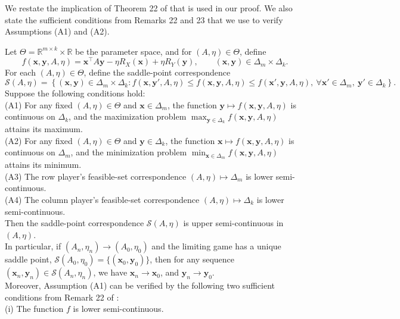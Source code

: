 \documentclass[12pt]{article}
\begin{document}
We restate the implication of Theorem 22 of \citet{feinberg2022continuity} that is used in our proof. 
We also state the sufficient conditions from Remarks 22 and 23 that we use to verify Assumptions (A1) and (A2).
\begin{lemma}
\label{lem:adapted-continuity-equilibria}
Let \(\Theta=\mathbb R^{m\times k}\times \mathbb R\) be the parameter space, and for 
\((A,\eta)\in\Theta\), define
\[
f(\bm x,\bm y,A,\eta)
=
\bm x^\top A\bm y-\eta R_X(\bm x)+\eta R_Y(\bm y),
\qquad
(\bm x,\bm y)\in \Delta_m\times \Delta_k .
\]
For each \((A,\eta)\in\Theta\), define the saddle-point correspondence
\[
\mathcal S(A,\eta)
=
\left\{
(\bm x,\bm y)\in\Delta_m\times\Delta_k:
f(\bm x,\bm y',A,\eta)
\le
f(\bm x,\bm y,A,\eta)
\le
f(\bm x',\bm y,A,\eta),
\ \forall \bm x'\in\Delta_m,\ \bm y'\in\Delta_k
\right\}.
\]
Suppose the following conditions hold: \\
(A1) For any fixed \((A,\eta)\in\Theta\) and \(\bm x\in\Delta_m\), the function $\bm y\mapsto f(\bm x,\bm y,A,\eta)$ is continuous on \(\Delta_k\), and the maximization problem $\max_{\bm y\in\Delta_k} f(\bm x,\bm y,A,\eta)$ attains its maximum. \\
(A2) For any fixed \((A,\eta)\in\Theta\) and \(\bm y\in\Delta_k\), the function $\bm x\mapsto f(\bm x,\bm y,A,\eta)$ is continuous on \(\Delta_m\), and the minimization problem $\min_{\bm x\in\Delta_m} f(\bm x,\bm y,A,\eta)$ attains its minimum. \\
(A3) The row player's feasible-set correspondence $(A,\eta)\mapsto \Delta_m$ is lower semi-continuous. \\
(A4) The column player's feasible-set correspondence $(A,\eta)\mapsto \Delta_k$ is lower semi-continuous. \\
Then the saddle-point correspondence \(\mathcal S(A,\eta)\) is upper semi-continuous in 
\((A,\eta)\). \\
In particular, if \((A_n,\eta_n)\to(A_0,\eta_0)\) and the limiting game has a unique saddle point, $\mathcal S(A_0,\eta_0)=\{(\bm x_0,\bm y_0)\}$, then for any sequence \((\bm x_n,\bm y_n)\in\mathcal S(A_n,\eta_n)\), we have $\bm x_n\to\bm x_0$, and $\bm y_n\to\bm y_0$. \\
Moreover, Assumption (A1) can be verified by the following two sufficient conditions from Remark 22 of \citet{feinberg2022continuity}: \\
(i) The function \(f\) is lower semi-continuous. \\

\end{lemma}
\end{document}
